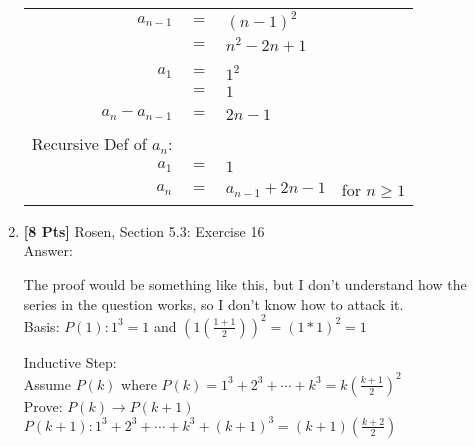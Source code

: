 \begin{enumerate}
\begin{table}[h]
\begin{tabular}{rcll}
$a_{n-1}$               & $=$ & $(n-1)^2$        &                                         \\
                        & $=$ & $n^2 - 2n + 1$   &                                         \\
                        &     &                  &                                         \\
$a_1$                   & $=$ & $1^2$            &                                         \\
                        & $=$ & $1$              &                                         \\
                        &     &                  &                                         \\
$a_n - a_{n-1}$         & $=$ & $2n-1$           &                                         \\
                        &     &                  &                                         \\
Recursive Def of $a_n$: &     &                  &                                         \\
$a_1$                   & $=$ & $1$              &                                         \\
$a_n$                   & $=$ & $a_{n-1} + 2n-1$ & for $n \geq 1$                         
\end{tabular}
\end{table}

\clearpage

\item {\bf [8 Pts]} Rosen, Section 5.3: Exercise 16\\
Answer:

The proof would be something like this, but I don't understand how the series in the question works, so I don't know how to attack it.\\

Basis: $P(1): 1^3 =  1$ and $(1(\frac{1+1}{2}))^2 = (1 * 1)^2 = 1$

Inductive Step:\\
Assume $P(k)$ where $P(k) = 1^3 + 2^3 + \cdots + k^3 = k(\frac{k+1}{2})^2$\\
Prove: $P(k) \rightarrow P(k+1)$\\
$P(k+1): 1^3 + 2^3 + \cdots + k^3 + (k+1)^3 = (k+1)(\frac{k+2}{2})$\\


\end{enumerate}
